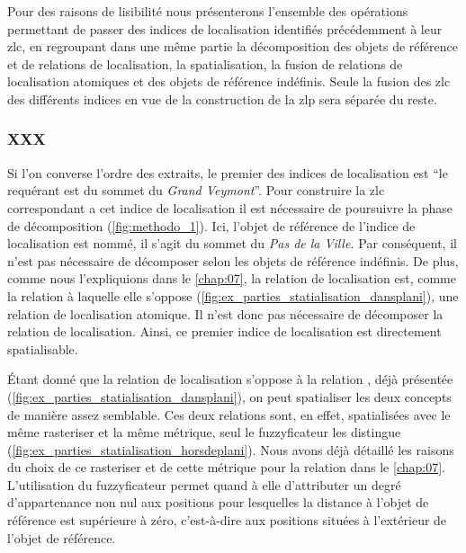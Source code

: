 Pour des raisons de lisibilité nous présenterons l'ensemble des
opérations permettant de passer des indices de localisation identifiés
précédemment à leur \ac{zlc}, en regroupant dans une même partie la
décomposition des objets de référence et de relations de localisation,
la spatialisation, la fusion de relations de localisation atomiques et
des objets de référence indéfinis. Seule la fusion des \ac{zlc} des
différents indices en vue de la construction de la \ac{zlp} sera
séparée du reste.

\subsubsection{XXX}

Si l'on converse l'ordre des extraits, le premier des indices de
localisation est \enquote{le requérant est
   du sommet du \emph{Grand
    Veymont}}. Pour construire la \ac{zlc} correspondant a cet indice
de localisation il est nécessaire de poursuivre la phase de
décomposition (\autoref{fig:methodo_1}). Ici, l'objet de référence de
l'indice de localisation est nommé, il s'agit du sommet du \emph{Pas
  de la Ville.} Par conséquent, il n'est pas nécessaire de décomposer
selon les objets de référence indéfinis. De plus, comme nous
l'expliquions dans le \autoref{chap:07}, la relation de localisation
 est, comme la relation
 à laquelle elle s'oppose
(\autoref{fig:ex_parties_statialisation_dansplani}), une relation de
localisation atomique. Il n'est donc pas nécessaire de décomposer la
relation de localisation. Ainsi, ce premier indice de localisation est
directement spatialisable.

Étant donné que la relation de localisation
 s'oppose à la relation
, déjà présentée
(\autoref{fig:ex_parties_statialisation_dansplani}), on peut
spatialiser les deux concepts de manière assez semblable. Ces deux
relations sont, en effet, spatialisées avec le même rasteriser et la
même métrique, seul le fuzzyficateur les distingue
(\autoref{fig:ex_parties_statialisation_horsdeplani}). Nous avons déjà
détaillé les raisons du choix de ce rasteriser et de cette métrique
pour la relation  dans le
\autoref{chap:07}. L'utilisation du fuzzyficateur 
permet quand à elle d'attributer un degré d'appartenance non nul aux
positions pour lesquelles la distance à l'objet de référence est
supérieure à zéro, c'est-à-dire aux positions situées à l'extérieur de
l'objet de référence.

